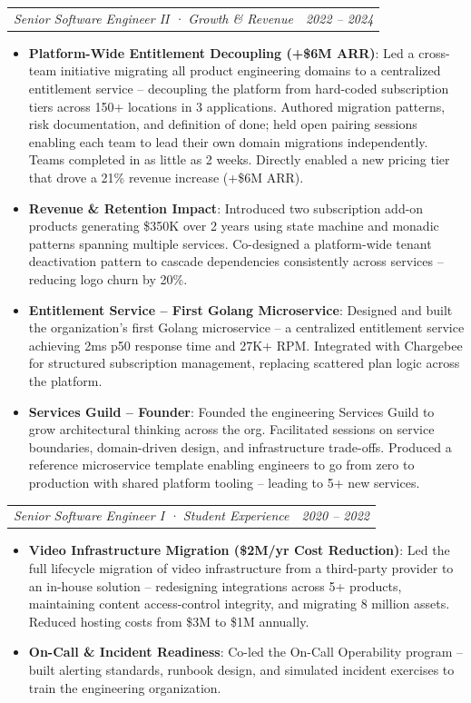 \documentclass[letterpaper,11pt]{article}
\makeatletter
\newcommand{\resumeItem}[2]{
  \item\small{
    \textbf{#1}{: #2 \vspace{-2pt}}
  }
}
\newcommand{\resumeSubSubheading}[2]{
    \begin{tabular*}{0.97\textwidth}{l@{\extracolsep{\fill}}r}
      \textit{\small#1} & \textit{\small #2} \\
    \end{tabular*}\vspace{-5pt}
}
\newcommand{\resumeItemListStart}{\begin{itemize}}
\newcommand{\resumeItemListEnd}{\end{itemize}\vspace{-5pt}}
\makeatother
\begin{document}
    \resumeSubSubheading
      {Senior Software Engineer II · Growth \& Revenue}{2022 -- 2024}
      \resumeItemListStart
        \resumeItem{Platform-Wide Entitlement Decoupling (+\$6M ARR)}
          {Led a cross-team initiative migrating all product engineering domains to a centralized entitlement service -- decoupling the platform from hard-coded subscription tiers across 150+ locations in 3 applications. Authored migration patterns, risk documentation, and definition of done; held open pairing sessions enabling each team to lead their own domain migrations independently. Teams completed in as little as 2 weeks. Directly enabled a new pricing tier that drove a 21\% revenue increase (+\$6M ARR).}
        \resumeItem{Revenue \& Retention Impact}
          {Introduced two subscription add-on products generating \$350K over 2 years using state machine and monadic patterns spanning multiple services. Co-designed a platform-wide tenant deactivation pattern to cascade dependencies consistently across services -- reducing logo churn by 20\%.}
        \resumeItem{Entitlement Service -- First Golang Microservice}
          {Designed and built the organization's first Golang microservice -- a centralized entitlement service achieving 2ms p50 response time and 27K+ RPM. Integrated with Chargebee for structured subscription management, replacing scattered plan logic across the platform.}
        \resumeItem{Services Guild -- Founder}
          {Founded the engineering Services Guild to grow architectural thinking across the org. Facilitated sessions on service boundaries, domain-driven design, and infrastructure trade-offs. Produced a reference microservice template enabling engineers to go from zero to production with shared platform tooling -- leading to 5+ new services.}
      \resumeItemListEnd

    \resumeSubSubheading
      {Senior Software Engineer I · Student Experience}{2020 -- 2022}
      \resumeItemListStart
        \resumeItem{Video Infrastructure Migration (\$2M/yr Cost Reduction)}
          {Led the full lifecycle migration of video infrastructure from a third-party provider to an in-house solution -- redesigning integrations across 5+ products, maintaining content access-control integrity, and migrating 8 million assets. Reduced hosting costs from \$3M to \$1M annually.}
        \resumeItem{On-Call \& Incident Readiness}
          {Co-led the On-Call Operability program -- built alerting standards, runbook design, and simulated incident exercises to train the engineering organization.}
      \resumeItemListEnd
\end{document}
